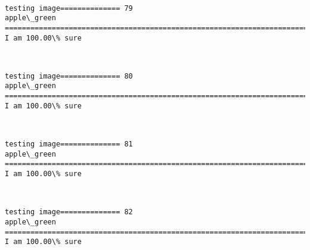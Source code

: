 \documentclass[11pt]{article}
\begin{document}
    \begin{center}
    \end{center}
    { \hspace*{\fill} \\}
    
    \begin{Verbatim}[commandchars=\\\{\}]
testing image============== 79
apple\_green
============================================================================
I am 100.00\% sure

    \end{Verbatim}

    \begin{center}
    \end{center}
    { \hspace*{\fill} \\}
    
    \begin{Verbatim}[commandchars=\\\{\}]
testing image============== 80
apple\_green
============================================================================
I am 100.00\% sure

    \end{Verbatim}

    \begin{center}
    \end{center}
    { \hspace*{\fill} \\}
    
    \begin{Verbatim}[commandchars=\\\{\}]
testing image============== 81
apple\_green
============================================================================
I am 100.00\% sure

    \end{Verbatim}

    \begin{center}
    \end{center}
    { \hspace*{\fill} \\}
    
    \begin{Verbatim}[commandchars=\\\{\}]
testing image============== 82
apple\_green
============================================================================
I am 100.00\% sure

    \end{Verbatim}
\end{document}
